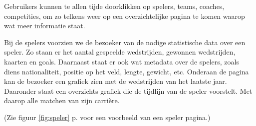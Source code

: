 \documentclass[11pt]{article}
\begin{document}
Gebruikers kunnen te allen tijde doorklikken op spelers, teams, coaches, competities, om zo telkens weer op een overzichtelijke pagina te komen waarop wat meer informatie staat.

Bij de spelers voorzien we de bezoeker van de nodige statistische data over een speler. Zo staan er het aantal gespeelde wedstrijden, gewonnen wedstrijden, kaarten en goals. Daarnaast staat er ook wat metadata over de spelers, zoals diens nationaliteit, positie op het veld, lengte, gewicht, etc.
Onderaan de pagina kan de bezoeker een grafiek zien met de wedstrijden van het laatste jaar. Daaronder staat een overzichts grafiek die de tijdlijn van de speler voorstelt. Met daarop alle matchen van zijn carri\`ere.

(Zie figuur \ref{fig:speler} p. \pageref{fig:speler} voor een voorbeeld van een speler pagina.)\\
\end{document}
